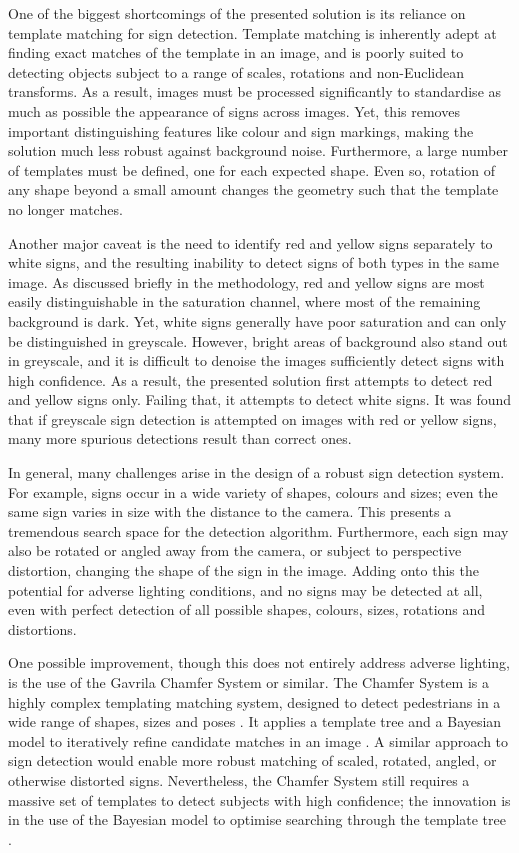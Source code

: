 One of the biggest shortcomings of the presented solution is its reliance on template matching for sign detection. Template matching is inherently adept at finding exact matches of the template in an image, and is poorly suited to detecting objects subject to a range of scales, rotations and non-Euclidean transforms. As a result, images must be processed significantly to standardise as much as possible the appearance of signs across images. Yet, this removes important distinguishing features like colour and sign markings, making the solution much less robust against background noise. Furthermore, a large number of templates must be defined, one for each expected shape. Even so, rotation of any shape beyond a small amount changes the geometry such that the template no longer matches.

Another major caveat is the need to identify red and yellow signs separately to white signs, and the resulting inability to detect signs of both types in the same image. As discussed briefly in the methodology, red and yellow signs are most easily distinguishable in the saturation channel, where most of the remaining background is dark. Yet, white signs generally have poor saturation and can only be distinguished in greyscale. However, bright areas of background also stand out in greyscale, and it is difficult to denoise the images sufficiently detect signs with high confidence. As a result, the presented solution first attempts to detect red and yellow signs only. Failing that, it attempts to detect white signs. It was found that if greyscale sign detection is attempted on images with red or yellow signs, many more spurious detections result than correct ones.

In general, many challenges arise in the design of a robust sign detection system. For example, signs occur in a wide variety of shapes, colours and sizes; even the same sign varies in size with the distance to the camera. This presents a tremendous search space for the detection algorithm. Furthermore, each sign may also be rotated or angled away from the camera, or subject to perspective distortion, changing the shape of the sign in the image. Adding onto this the potential for adverse lighting conditions, and no signs may be detected at all, even with perfect detection of all possible shapes, colours, sizes, rotations and distortions.

One possible improvement, though this does not entirely address adverse lighting, is the use of the Gavrila Chamfer System \cite{gavrila_2007} \cite{gavrila_nd} or similar. The Chamfer System is a highly complex templating matching system, designed to detect pedestrians in a wide range of shapes, sizes and poses \cite{gavrila_2007}. It applies a template tree and a Bayesian model to iteratively refine candidate matches in an image \cite{gavrila_nd}. A similar approach to sign detection would enable more robust matching of scaled, rotated, angled, or otherwise distorted signs. Nevertheless, the Chamfer System still requires a massive set of templates to detect subjects with high confidence; the innovation is in the use of the Bayesian model to optimise searching through the template tree \cite{gavrila_2007}.

